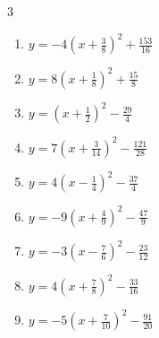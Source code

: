 \begin{multicols}{3}
\begin{enumerate}

  \item $\displaystyle y=-4\left( x+\frac{3}{8}\right)^{2}+\frac{153}{16}$


  \item $\displaystyle y=8\left( x+\frac{1}{8}\right)^{2}+\frac{15}{8}$


  \item $\displaystyle y=\left( x+\frac{1}{2}\right)^{2}-\frac{29}{4}$


  \item $\displaystyle y=7\left( x+\frac{3}{14}\right)^{2}-\frac{121}{28}$


  \item $\displaystyle y=4\left( x-\frac{1}{4}\right)^{2}-\frac{37}{4}$


  \item $\displaystyle y=-9\left( x+\frac{4}{9}\right)^{2}-\frac{47}{9}$


  \item $\displaystyle y=-3\left( x-\frac{7}{6}\right)^{2}-\frac{23}{12}$


  \item $\displaystyle y=4\left( x+\frac{7}{8}\right)^{2}-\frac{33}{16}$


  \item $\displaystyle y=-5\left( x+\frac{7}{10}\right)^{2}-\frac{91}{20}$



\end{enumerate}
\end{multicols}
